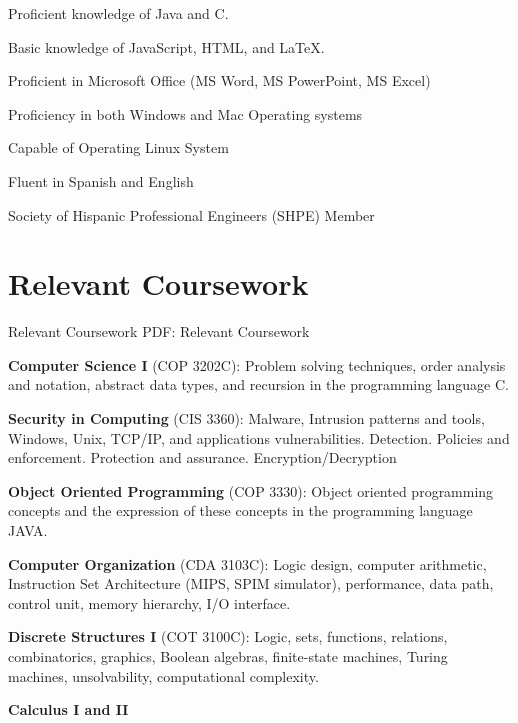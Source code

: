 \documentclass[letterpaper,MMMyyyy,nonstop]{simpleresumecv}
\begin{document}
\begin{body}
\BulletItem
Proficient knowledge of Java and C.
\hfill

\Gap
\BulletItem
Basic knowledge of JavaScript, HTML, and LaTeX.
\hfill

\Gap
\BulletItem
Proficient in Microsoft Office (MS Word, MS PowerPoint, MS Excel)
\hfill

\Gap
\BulletItem
Proficiency in both Windows and Mac Operating systems
\hfill

\Gap
\BulletItem
Capable of Operating Linux System
\hfill

\Gap
\BulletItem
Fluent in Spanish and English
\hfill

\Gap
\BulletItem
Society of Hispanic Professional Engineers (SHPE) Member
\hfill


\section
{Relevant
Coursework}
{ Relevant Coursework}
{PDF: Relevant 
Coursework}

\BulletItem
\textbf{Computer Science I }(COP 3202C): Problem solving techniques, order analysis and notation,
abstract data types, and recursion in the programming language C.
\hfill

\Gap
\BulletItem
\textbf{Security in Computing} (CIS 3360):  Malware, Intrusion patterns
and tools, Windows, Unix, TCP/IP, and applications
vulnerabilities. Detection. Policies and enforcement.
Protection and assurance. Encryption/Decryption
\hfill

\Gap
\BulletItem
\textbf{Object Oriented Programming} (COP 3330): Object
oriented programming concepts and the expression
of these concepts in the programming language JAVA.
\hfill

\Gap
\BulletItem
\textbf{Computer Organization} (CDA 3103C):  Logic design, computer arithmetic,
Instruction Set Architecture (MIPS, SPIM simulator),
performance, data path, control unit, memory hierarchy, I/O
interface.
\hfill

\Gap
\BulletItem
\textbf{Discrete Structures I }(COT 3100C): Logic, sets, functions, relations, combinatorics,
graphics, Boolean algebras, finite-state machines, Turing
machines, unsolvability, computational complexity.
\hfill

\Gap
\BulletItem
\textbf{Calculus I and II}
\hfill


\end {body}
\end{document}
